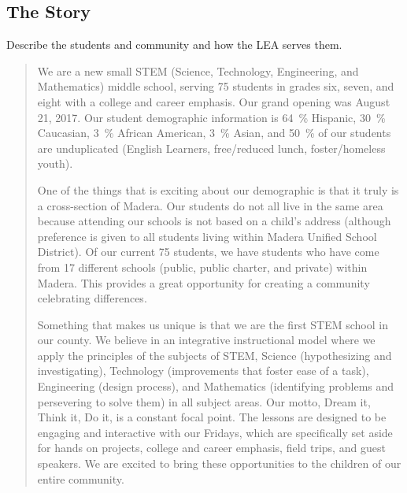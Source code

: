 \documentclass{article}
\begin{document}
\subsection{The Story}
Describe the students and community and how the LEA serves them.
\begin{quotation}
	We are a new small STEM (Science, Technology, Engineering, and Mathematics) middle school, serving 75 students in grades six, seven, and eight with a college and career emphasis. Our grand opening was August 21, 2017. Our student demographic information is \SI{64}{\percent} Hispanic, \SI{30}{\percent} Caucasian, \SI{3}{\percent} African American, \SI{3}{\percent} Asian, and \SI{50}{\percent} of our students are unduplicated (English Learners, free/reduced lunch, foster/homeless youth).

	One of the things that is exciting about our demographic is that it truly is a cross-section of Madera. Our students do not all live in the same area because attending our schools is not based on a child's address (although preference is given to all students living within Madera Unified School District). Of our current 75 students, we have students who have come from 17 different schools (public, public charter, and private) within Madera. This provides a great opportunity for creating a community celebrating differences.

	Something that makes us unique is that we are the first STEM school in our county. We believe in an integrative instructional model where we apply the principles of the subjects of STEM, Science (hypothesizing and investigating), Technology (improvements that foster ease of a task), Engineering (design process), and Mathematics (identifying problems and persevering to solve them) in all subject areas. Our motto, Dream it, Think it, Do it, is a constant focal point. The lessons are designed to be engaging and interactive with our Fridays, which are specifically set aside for hands on projects, college and career emphasis, field trips, and guest speakers. We are excited to bring these opportunities to the children of our entire community.
\end{quotation}
\end{document}
